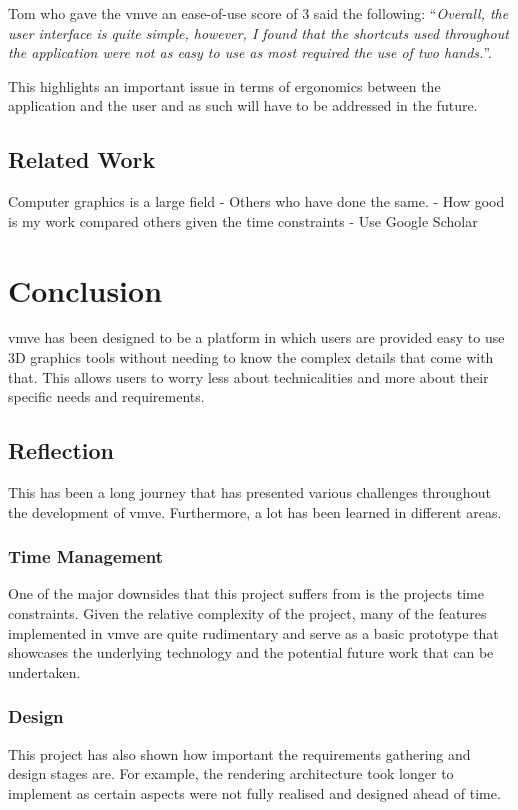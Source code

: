 \documentclass[11pt]{article}
\begin{document}
Tom who gave the \gls*{vmve} an ease-of-use score of 3 said the following:
``\textit{Overall, the user interface is quite simple, however, I found that 
the shortcuts used throughout the application were not as easy to use as most
required the use of two hands.}''. 

This highlights an important issue in terms of ergonomics between the
application and the user and as such will have to be addressed in the future.



\subsection{Related Work}
Computer graphics is a large field 
- Others who have done the same.
- How good is my work compared others given the time constraints
- Use Google Scholar 

\clearpage
\section{Conclusion} \label{conclusion}

\gls*{vmve} has been designed to be a platform in which users are provided easy to use
3D graphics tools without needing to know the complex details that come with
that. This allows users to worry less about technicalities and more about their
specific needs and requirements.

\subsection{Reflection}
This has been a long journey that has presented various challenges throughout
the development of \gls*{vmve}. Furthermore, a lot has been learned in different
areas.

\subsubsection{Time Management}
One of the major downsides that this project suffers from is the projects time
constraints. Given the relative complexity of the project, many of the features
implemented in \gls*{vmve} are quite rudimentary and serve as a basic prototype
that showcases the underlying technology and the potential future work that can
be undertaken.

\subsubsection{Design}
This project has also shown how important the requirements gathering and design
stages are. For example, the rendering architecture took longer to implement as 
certain aspects were not fully realised and designed ahead of time.
\end{document}

